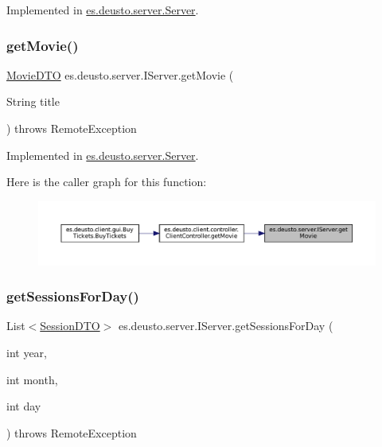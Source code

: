 Implemented in \mbox{\hyperlink{classes_1_1deusto_1_1server_1_1_server_aa5f1973de47331683592355aaa036bfb}{es.\+deusto.\+server.\+Server}}.

\mbox{\label{interfacees_1_1deusto_1_1server_1_1_i_server_a2b7883e416d98a7c92de13cbed7af450}} 
\subsubsection{\texorpdfstring{getMovie()}{getMovie()}}
{\footnotesize\ttfamily \mbox{\hyperlink{classes_1_1deusto_1_1server_1_1data_1_1_movie_d_t_o}{Movie\+D\+TO}} es.\+deusto.\+server.\+I\+Server.\+get\+Movie (\begin{DoxyParamCaption}\item[{String}]{title }\end{DoxyParamCaption}) throws Remote\+Exception}



Implemented in \mbox{\hyperlink{classes_1_1deusto_1_1server_1_1_server_a7e4544c63bcf2b2d3abce0d2ff1567ac}{es.\+deusto.\+server.\+Server}}.

Here is the caller graph for this function\+:
\nopagebreak
\begin{figure}[H]
\begin{center}
\leavevmode
\includegraphics[width=350pt]{interfacees_1_1deusto_1_1server_1_1_i_server_a2b7883e416d98a7c92de13cbed7af450_icgraph}
\end{center}
\end{figure}
\mbox{\label{interfacees_1_1deusto_1_1server_1_1_i_server_aac50d6a77e30df4d4c15fcaf4ba979f5}} 
\subsubsection{\texorpdfstring{getSessionsForDay()}{getSessionsForDay()}}
{\footnotesize\ttfamily List$<$\mbox{\hyperlink{classes_1_1deusto_1_1server_1_1data_1_1_session_d_t_o}{Session\+D\+TO}}$>$ es.\+deusto.\+server.\+I\+Server.\+get\+Sessions\+For\+Day (\begin{DoxyParamCaption}\item[{int}]{year,  }\item[{int}]{month,  }\item[{int}]{day }\end{DoxyParamCaption}) throws Remote\+Exception}



